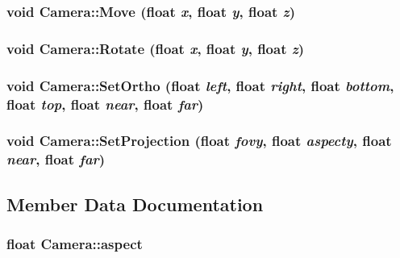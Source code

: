 \hypertarget{class_camera_6bab9bc5cb0e297bbe9b15c260426569}{
\subsubsection[{Move}]{\setlength{\rightskip}{0pt plus 5cm}void Camera::Move (float {\em x}, \/  float {\em y}, \/  float {\em z})}}
\label{class_camera_6bab9bc5cb0e297bbe9b15c260426569}


\hypertarget{class_camera_614035aa2108e212946092789cb487ce}{
\subsubsection[{Rotate}]{\setlength{\rightskip}{0pt plus 5cm}void Camera::Rotate (float {\em x}, \/  float {\em y}, \/  float {\em z})}}
\label{class_camera_614035aa2108e212946092789cb487ce}


\hypertarget{class_camera_390dde06b427b5bca332dec8bf3ec96f}{
\subsubsection[{SetOrtho}]{\setlength{\rightskip}{0pt plus 5cm}void Camera::SetOrtho (float {\em left}, \/  float {\em right}, \/  float {\em bottom}, \/  float {\em top}, \/  float {\em near}, \/  float {\em far})}}
\label{class_camera_390dde06b427b5bca332dec8bf3ec96f}


\hypertarget{class_camera_61958f307ad537f208531b9926fd2353}{
\subsubsection[{SetProjection}]{\setlength{\rightskip}{0pt plus 5cm}void Camera::SetProjection (float {\em fovy}, \/  float {\em aspecty}, \/  float {\em near}, \/  float {\em far})}}
\label{class_camera_61958f307ad537f208531b9926fd2353}




\subsection{Member Data Documentation}
\hypertarget{class_camera_181aff3db1ae87a837ddc3a97e5b0f43}{
\subsubsection[{aspect}]{\setlength{\rightskip}{0pt plus 5cm}float {\bf Camera::aspect}}}
\label{class_camera_181aff3db1ae87a837ddc3a97e5b0f43}



